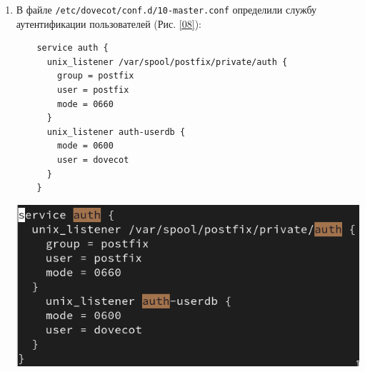 \begin{enumerate}
\item В файле \texttt{/etc/dovecot/conf.d/10-master.conf} определили службу аутентификации пользователей (Рис. \ref{08}):
  \begin{verbatim}
    service auth {
      unix_listener /var/spool/postfix/private/auth {
        group = postfix
        user = postfix
        mode = 0660
      }
      unix_listener auth-userdb {
        mode = 0600
        user = dovecot
      }
    }
  \end{verbatim}
\begin{center}
    \centering
    \includegraphics[width=\textwidth]{../images/image08.png}
    \label{08}
\end{center}


\end{enumerate}
